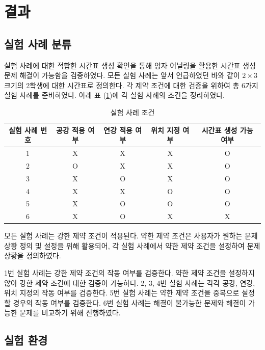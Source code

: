 \documentclass[12pt,a4paper]{article}
\begin{document}
    \section{결과}

    \subsection{실험 사례 분류}

    실험 사례에 대한 적합한 시간표 생성 확인을 통해 양자 어닐링을 활용한 시간표 생성 문제 해결이 가능함을 검증하였다. 모든 실험 사례는 앞서 언급하였던 바와 같이 $2\times3$ 크기의 2학생에 대한 시간표로 정의한다. 각 제약 조건에 대한 검증을 위하여 총 6가지 실험 사례를 준비하였다. 아래 표 (\ref{tab:kindofcase})에 각 실험 사례의 조건을 정리하였다.

    \begin{table}[htb!]
        \centering
        \begin{tabular}{ c c c c c }
        \hline
        실험 사례 번호 & 공강 적용 여부 & 연강 적용 여부 & 위치 지정 여부 & 시간표 생성 가능 여부 \\
        \hline
        1 & X & X & X & O \\
        2 & O & X & X & O \\
        3 & X & O & X & O \\
        4 & X & X & O & O \\
        5 & X & O & O & O \\
        6 & X & O & X & X \\
        \hline
        \end{tabular}
        \caption{실험 사례 조건}\label{tab:kindofcase}
    \end{table}

    모든 실험 사례는 강한 제약 조건이 적용된다. 약한 제약 조건은 사용자가 원하는 문제 상황 정의 및 설정을 위해 활용되어, 각 실험 사례에서 약한 제약 조건을 설정하여 문제 상황을 정의하였다.

    1번 실험 사례는 강한 제약 조건의 작동 여부를 검증한다. 약한 제약 조건을 설정하지 않아 강한 제약 조건에 대한 검증이 가능하다. 2, 3, 4번 실험 사례는 각각 공강, 연강, 위치 지정의 작동 여부를 검증한다. 5번 실험 사례는 약한 제약 조건을 중복으로 설정할 경우의 작동 여부를 검증한다. 6번 실험 사례는 해결이 불가능한 문제와 해결이 가능한 문제를 비교하기 위해 진행하였다.

    \subsection{실험 환경}
\end{document}
